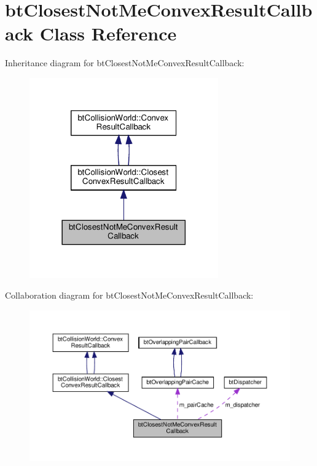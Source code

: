 \hypertarget{classbtClosestNotMeConvexResultCallback}{}\section{bt\+Closest\+Not\+Me\+Convex\+Result\+Callback Class Reference}
\label{classbtClosestNotMeConvexResultCallback}


Inheritance diagram for bt\+Closest\+Not\+Me\+Convex\+Result\+Callback\+:
\nopagebreak
\begin{figure}[H]
\begin{center}
\leavevmode
\includegraphics[width=230pt]{classbtClosestNotMeConvexResultCallback__inherit__graph}
\end{center}
\end{figure}


Collaboration diagram for bt\+Closest\+Not\+Me\+Convex\+Result\+Callback\+:
\nopagebreak
\begin{figure}[H]
\begin{center}
\leavevmode
\includegraphics[width=350pt]{classbtClosestNotMeConvexResultCallback__coll__graph}
\end{center}
\end{figure}
